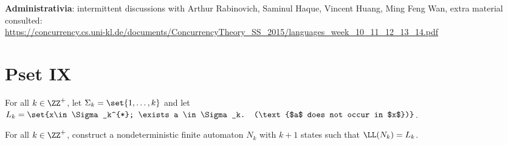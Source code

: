 \documentclass[11pt]{scrartcl}
\begin{document}
\textbf{Administrativia}: intermittent discussions with Arthur
Rabinovich, Saminul Haque, Vincent Huang, Ming Feng Wan, extra
material consulted:\\ \url{https://concurrency.cs.uni-kl.de/documents/ConcurrencyTheory_SS_2015/languages_week_10_11_12_13_14.pdf}
\section*{Pset IX}

For all $k\in \ZZ^+$, let $\Sigma_k = \set{1, \dots, k}$ and let
$L_k = \set{x\in\Sigma_k^{*}; \exists a \in \Sigma_k. (\text{$a$ does
    not occur in $x$})}$.

\begin{problem*}
  \hfill

  For all $k\in \ZZ^+$, construct a nondeterministic finite automaton
  $N_k$ with $k+1$ states such that $\LL(N_k) = L_k$.
\end{problem*}
\end{document}
